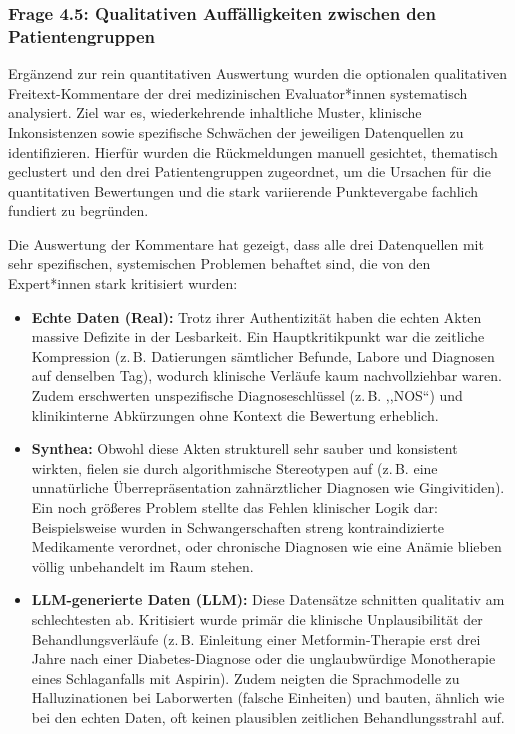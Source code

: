 \subsubsection{Frage 4.5: Qualitativen Auffälligkeiten zwischen den Patientengruppen}
\begin{description}[style=nextline, font=\bfseries]
\item[Methodik] Ergänzend zur rein quantitativen Auswertung wurden die optionalen qualitativen Freitext-Kommentare der drei medizinischen Evaluator*innen systematisch analysiert. Ziel war es, wiederkehrende inhaltliche Muster, klinische Inkonsistenzen sowie spezifische Schwächen der jeweiligen Datenquellen zu identifizieren. Hierfür wurden die Rückmeldungen manuell gesichtet, thematisch geclustert und den drei Patientengruppen zugeordnet, um die Ursachen für die quantitativen Bewertungen und die stark variierende Punktevergabe fachlich fundiert zu begründen.

\item[Ergebnisse] Die Auswertung der Kommentare hat gezeigt, dass alle drei Datenquellen mit sehr spezifischen, systemischen Problemen behaftet sind, die von den Expert*innen stark kritisiert wurden:
\begin{itemize}
    \item \textbf{Echte Daten (Real):} Trotz ihrer Authentizität haben die echten Akten massive Defizite in der Lesbarkeit. Ein Hauptkritikpunkt war die zeitliche Kompression (z.\,B. Datierungen sämtlicher Befunde, Labore und Diagnosen auf denselben Tag), wodurch klinische Verläufe kaum nachvollziehbar waren. Zudem erschwerten unspezifische Diagnoseschlüssel (z.\,B. ,,NOS``) und klinikinterne Abkürzungen ohne Kontext die Bewertung erheblich.
    \item \textbf{Synthea:} Obwohl diese Akten strukturell sehr sauber und konsistent wirkten, fielen sie durch algorithmische Stereotypen auf (z.\,B. eine unnatürliche Überrepräsentation zahnärztlicher Diagnosen wie Gingivitiden). Ein noch größeres Problem stellte das Fehlen klinischer Logik dar: Beispielsweise wurden in Schwangerschaften streng kontraindizierte Medikamente verordnet, oder chronische Diagnosen wie eine Anämie blieben völlig unbehandelt im Raum stehen.
    \item \textbf{LLM-generierte Daten (LLM):} Diese Datensätze schnitten qualitativ am schlechtesten ab. Kritisiert wurde primär die klinische Unplausibilität der Behandlungsverläufe (z.\,B. Einleitung einer Metformin-Therapie erst drei Jahre nach einer Diabetes-Diagnose oder die unglaubwürdige Monotherapie eines Schlaganfalls mit Aspirin). Zudem neigten die Sprachmodelle zu Halluzinationen bei Laborwerten (falsche Einheiten) und bauten, ähnlich wie bei den echten Daten, oft keinen plausiblen zeitlichen Behandlungsstrahl auf.
\end{itemize}


\end{description}
